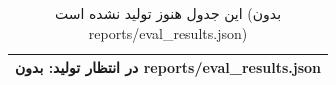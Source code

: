 \begin{table}[H]
\centering
\caption{این جدول هنوز تولید نشده است (بدون reports/eval\_results.json)}
\label{tab:v2-conditions}
\begin{tabular}{l}
\toprule
در انتظار تولید: بدون reports/eval\_results.json \\
\bottomrule
\end{tabular}
\end{table}
